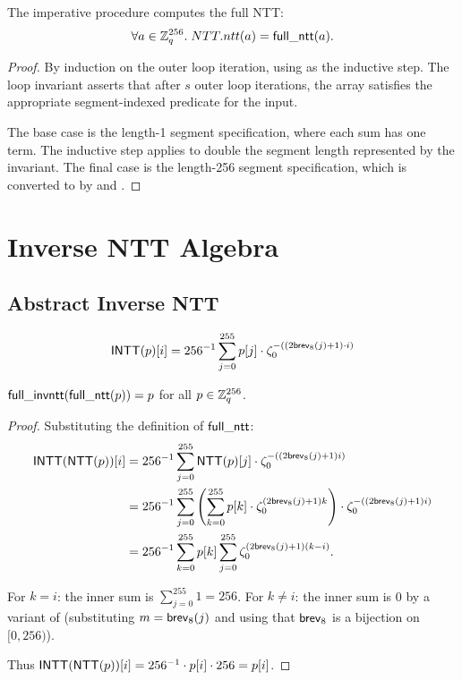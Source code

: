 \begin{theorem}
  The imperative procedure  computes the full NTT:
  \[
    \forall a \in \mathbb{Z}_q^{256}.\;
    NTT.ntt(a) = \mathsf{full\_ntt}(a).
  \]
\label{thm:ntt_correct}
\end{theorem}

\begin{proof}
  By induction on the outer loop iteration, using 
  as the inductive step.  The loop invariant asserts that after $s$ outer
  loop iterations, the array satisfies the appropriate segment-indexed
   predicate for the input.

  The base case is the length-1 segment specification, where each sum has one
  term.  The inductive step applies  to double the
  segment length represented by the invariant.
  The final case is the length-256 segment specification, which is converted
  to  by  and .
\end{proof}

\section{Inverse NTT Algebra}

\subsection{Abstract Inverse NTT}

\begin{definition}
  \[
    \mathsf{INTT}(p)[i] = 256^{-1} \sum_{j=0}^{255} p[j] \cdot \zeta_0^{-((2\mathsf{brev}_8(j)+1) \cdot i)}
  \]
\label{def:full_intt2}
\end{definition}

\begin{proposition}
  $\mathsf{full\_invntt}(\mathsf{full\_ntt}(p)) = p$ for all $p \in \mathbb{Z}_q^{256}$.
\label{thm:intt_correct}
\end{proposition}

\begin{proof}
  Substituting the definition of $\mathsf{full\_ntt}$:
  \begin{align*}
    \mathsf{INTT}(\mathsf{NTT}(p))[i]
    &= 256^{-1} \sum_{j=0}^{255} \mathsf{NTT}(p)[j] \cdot \zeta_0^{-((2\mathsf{brev}_8(j)+1) i)} \\
    &= 256^{-1} \sum_{j=0}^{255}
       \left(\sum_{k=0}^{255} p[k] \cdot \zeta_0^{(2\mathsf{brev}_8(j)+1)k}\right)
       \cdot \zeta_0^{-((2\mathsf{brev}_8(j)+1)i)} \\
    &= 256^{-1} \sum_{k=0}^{255} p[k]
       \sum_{j=0}^{255} \zeta_0^{(2\mathsf{brev}_8(j)+1)(k-i)}.
  \end{align*}

  For $k = i$: the inner sum is $\sum_{j=0}^{255} 1 = 256$.
  For $k \ne i$: the inner sum is 0 by a variant of 
  (substituting $m = \mathsf{brev}_8(j)$ and using that $\mathsf{brev}_8$ is a bijection on $[0,256)$).

  Thus $\mathsf{INTT}(\mathsf{NTT}(p))[i] = 256^{-1} \cdot p[i] \cdot 256 = p[i]$.
\end{proof}

